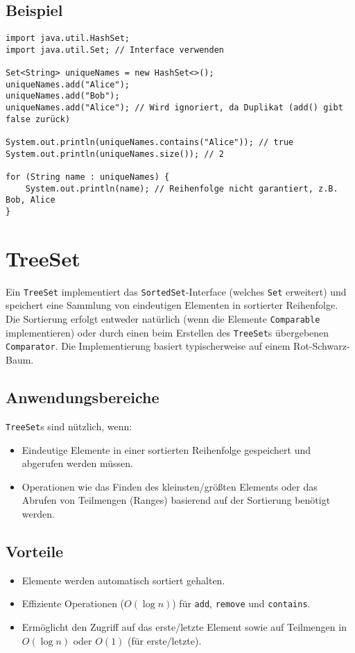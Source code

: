 \subsection{Beispiel}
\begin{lstlisting}[caption={Beispiel für die Verwendung eines HashSet in Java}, label=lst:hashSetExample]
import java.util.HashSet;
import java.util.Set; // Interface verwenden

Set<String> uniqueNames = new HashSet<>();
uniqueNames.add("Alice");
uniqueNames.add("Bob");
uniqueNames.add("Alice"); // Wird ignoriert, da Duplikat (add() gibt false zurück)

System.out.println(uniqueNames.contains("Alice")); // true
System.out.println(uniqueNames.size()); // 2

for (String name : uniqueNames) {
    System.out.println(name); // Reihenfolge nicht garantiert, z.B. Bob, Alice
}
\end{lstlisting}

\section{TreeSet}
Ein \texttt{TreeSet} implementiert das \texttt{SortedSet}-Interface (welches \texttt{Set} erweitert) und speichert eine Sammlung von eindeutigen Elementen in sortierter Reihenfolge. Die Sortierung erfolgt entweder natürlich (wenn die Elemente \texttt{Comparable} implementieren) oder durch einen beim Erstellen des \texttt{TreeSet}s übergebenen \texttt{Comparator}. Die Implementierung basiert typischerweise auf einem Rot-Schwarz-Baum.

\subsection{Anwendungsbereiche}
\texttt{TreeSet}s sind nützlich, wenn:
\begin{itemize}
    \item Eindeutige Elemente in einer sortierten Reihenfolge gespeichert und abgerufen werden müssen.
    \item Operationen wie das Finden des kleinsten/größten Elements oder das Abrufen von Teilmengen (Ranges) basierend auf der Sortierung benötigt werden.
\end{itemize}

\subsection{Vorteile}
\begin{itemize}
    \item Elemente werden automatisch sortiert gehalten.
    \item Effiziente Operationen ($O(\log n)$) für \texttt{add}, \texttt{remove} und \texttt{contains}.
    \item Ermöglicht den Zugriff auf das erste/letzte Element sowie auf Teilmengen in $O(\log n)$ oder $O(1)$ (für erste/letzte).
\end{itemize}


